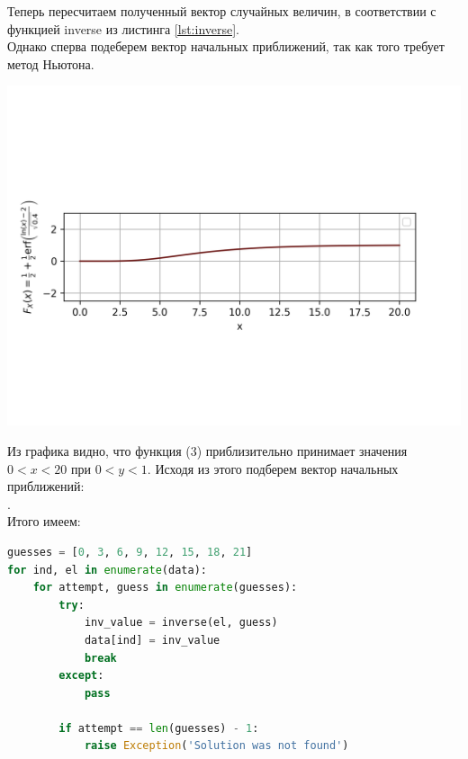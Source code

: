 \documentclass[a4paper, 14pt]{extarticle}
\begin{document}
Теперь пересчитаем полученный вектор случайных величин, в соответствии с функцией inverse из 
листинга \ref{lst:inverse}. \\
Однако сперва подеберем вектор начальных приближений, так как того требует метод Ньютона.

\vspace{-80pt}
\includegraphics[width=1\textwidth]{cdf}
\vspace{-80pt}

Из графика видно, что функция (3) приблизительно принимает значения $0 < x < 20$ при $0 < y < 1$. 
Исходя из этого подберем вектор начальных приближений: \\ \null
[0, 3, 6, 9, 12, 15, 18, 21]. \\

Итого имеем:

\begin{center}
  \begin{lstlisting}[language=Python]
guesses = [0, 3, 6, 9, 12, 15, 18, 21]
for ind, el in enumerate(data):
    for attempt, guess in enumerate(guesses):
        try: 
            inv_value = inverse(el, guess)
            data[ind] = inv_value
            break
        except:
            pass

        if attempt == len(guesses) - 1:
            raise Exception('Solution was not found')
  \end{lstlisting}
\end{center}
\end{document}

